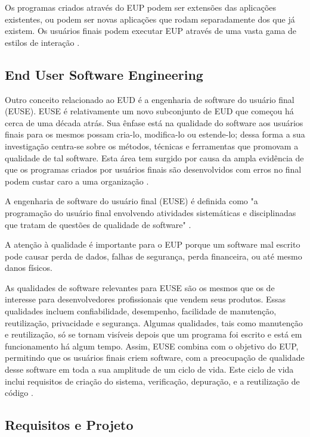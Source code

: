 Os programas criados através do EUP podem ser extensões das aplicações existentes, ou podem ser novas aplicações que rodam separadamente dos que já existem. Os usuários finais podem executar EUP através de uma vasta gama de estilos de interação \cite{nardi1993small}.

\subsection{End User Software Engineering}

Outro conceito relacionado ao EUD é a engenharia de software do usuário final (EUSE). EUSE é relativamente um novo subconjunto de EUD que começou há cerca de uma década atrás. Sua ênfase está na qualidade do software aos usuários finais para os mesmos possam cria-lo, modifica-lo ou estende-lo; dessa forma a sua investigação centra-se sobre os métodos, técnicas e ferramentas que promovam a qualidade de tal software. Esta área tem surgido por causa da ampla evidência de que os programas criados por usuários finais são desenvolvidos com erros no final podem custar caro a uma organização \cite{panko1998we,burnett2010technology,ko2011state}.

A engenharia de software do usuário final (EUSE) é definida como "a programação do usuário final envolvendo atividades sistemáticas e disciplinadas que tratam de questões de qualidade de software" \cite{ko2011state}.

A atenção à qualidade é importante para o EUP porque um software mal escrito pode causar perda de dados, falhas de segurança, perda financeira, ou até mesmo danos físicos.

As qualidades de software relevantes para EUSE são os mesmos que os de interesse para desenvolvedores profissionais que vendem seus produtos. Essas qualidades incluem confiabilidade, desempenho, facilidade de manutenção, reutilização, privacidade e segurança. Algumas qualidades, tais como manutenção e reutilização, só se tornam visíveis depois que um programa foi escrito e está em funcionamento há algum tempo. Assim, EUSE combina com o objetivo do EUP, permitindo que os usuários finais criem software, com a preocupação de qualidade desse software em toda a sua amplitude de um ciclo de vida. Este ciclo de vida inclui requisitos de criação do sistema, verificação, depuração, e a reutilização de código \cite{ko2011state}.

\subsection{Requisitos e Projeto}

